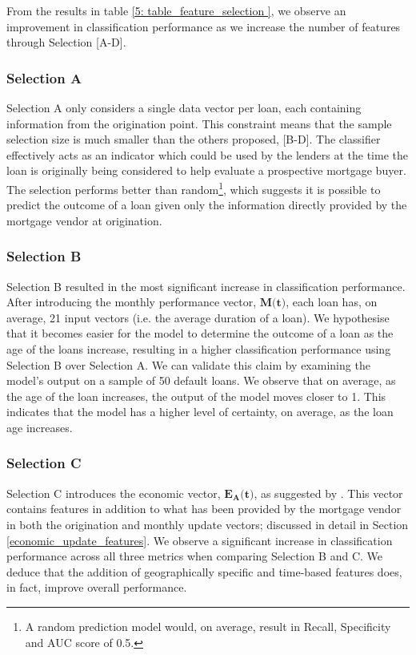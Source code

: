             From the results in table \ref{5: table_feature_selection }, we observe an improvement in classification performance as we increase the number of features through Selection [A-D]. 
            
            \subsubsection{Selection A}
            Selection A only considers a single data vector per loan, each containing information from the origination point. This constraint means that the sample selection size is much smaller than the others proposed, [B-D]. The classifier effectively acts as an indicator which could be used by the lenders at the time the loan is originally being considered to help evaluate a prospective mortgage buyer. The selection performs better than random\footnote{A random prediction model would, on average, result in Recall, Specificity and AUC score of 0.5.}, which suggests it is possible to predict the outcome of a loan given only the information directly provided by the mortgage vendor at origination.  
            
            \subsubsection{Selection B}
            Selection B resulted in the most significant increase in classification performance. After introducing the monthly performance vector, $\textbf{M(t)}$, each loan has, on average, 21 input vectors (i.e. the average duration of a loan). We hypothesise that it becomes easier for the model to determine the outcome of a loan as the age of the loans increase, resulting in a higher classification performance using Selection B over Selection A. We can validate this claim by examining the model's output on a sample of 50 default loans. We observe that on average, as the age of the loan increases, the output of the model moves closer to 1. This indicates that the model has a higher level of certainty, on average, as the loan age increases.  
            
            \subsubsection{Selection C}
            Selection C introduces the economic vector, $\textbf{$\textbf{$\mathbf{E_{A}}$}$(t)}$, as suggested by \cite{mortgage_risk}. This vector contains features in addition to what has been provided by the mortgage vendor in both the origination and monthly update vectors; discussed in detail in Section \ref{economic_update_features}. We observe a significant increase in classification performance across all three metrics when comparing Selection B and C. We deduce that the addition of geographically specific and time-based features does, in fact, improve overall performance. 
            
